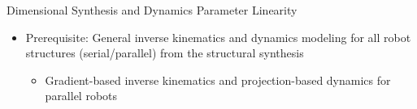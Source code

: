 \documentclass[c]{beamer}
\begin{document}
\begin{frame}
\begin{whiteblock}{Dimensional Synthesis and Dynamics Parameter Linearity}
{\begin{multicols}{2}
\begin{itemize}
    \item Prerequisite: General inverse kinematics and dynamics modeling for all robot structures (serial/parallel) from the structural synthesis
    \begin{itemize}
        \item Gradient-based inverse kinematics and projection-based dynamics for parallel robots
    \end{itemize}
\end{itemize}
\begin{figure}[t]
    \centering
    
\end{figure}


\end{multicols}}
\end{whiteblock}
\end{frame}
\end{document}
